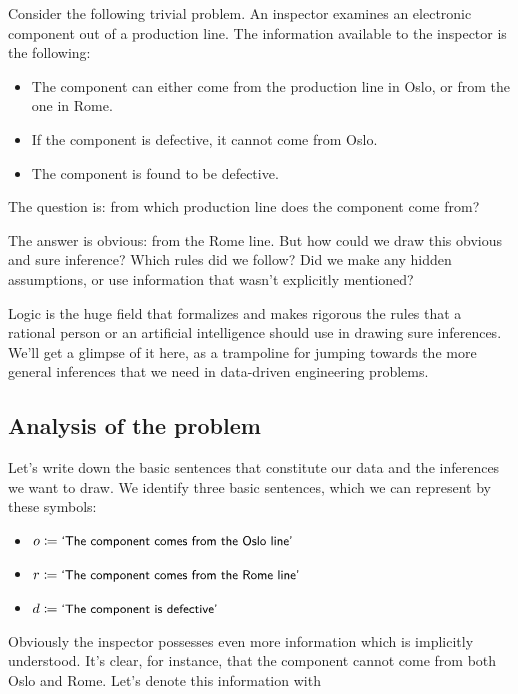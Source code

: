 \documentclass[
  a4paper,
  DIV=11,
  numbers=noendperiod,
  oneside]{scrreprt}
\begin{document}
Consider the following trivial problem. An inspector examines an
electronic component out of a production line. The information available
to the inspector is the following:

\begin{itemize}
\item
  The component can either come from the production line in Oslo, or
  from the one in Rome.
\item
  If the component is defective, it cannot come from Oslo.
\item
  The component is found to be defective.
\end{itemize}

The question is: from which production line does the component come
from?

The answer is obvious: from the Rome line. But how could we draw this
obvious and sure inference? Which rules did we follow? Did we make any
hidden assumptions, or use information that wasn't explicitly mentioned?

Logic is the huge field that formalizes and makes rigorous the rules
that a rational person or an artificial intelligence should use in
drawing sure inferences. We'll get a glimpse of it here, as a trampoline
for jumping towards the more general inferences that we need in
data-driven engineering problems.

\hypertarget{analysis-of-the-problem}{%
\subsection{Analysis of the problem}\label{analysis-of-the-problem}}

Let's write down the basic sentences that constitute our data and the
inferences we want to draw. We identify three basic sentences, which we
can represent by these symbols:

\begin{itemize}
\item
  \(o \coloneqq \textsf{\small`The component comes from the Oslo line'}\)
\item
  \(r \coloneqq \textsf{\small`The component comes from the Rome line'}\)
\item
  \(d \coloneqq \textsf{\small`The component is defective'}\)
\end{itemize}

Obviously the inspector possesses even more information which is
implicitly understood. It's clear, for instance, that the component
cannot come from both Oslo and Rome. Let's denote this information with
\end{document}

